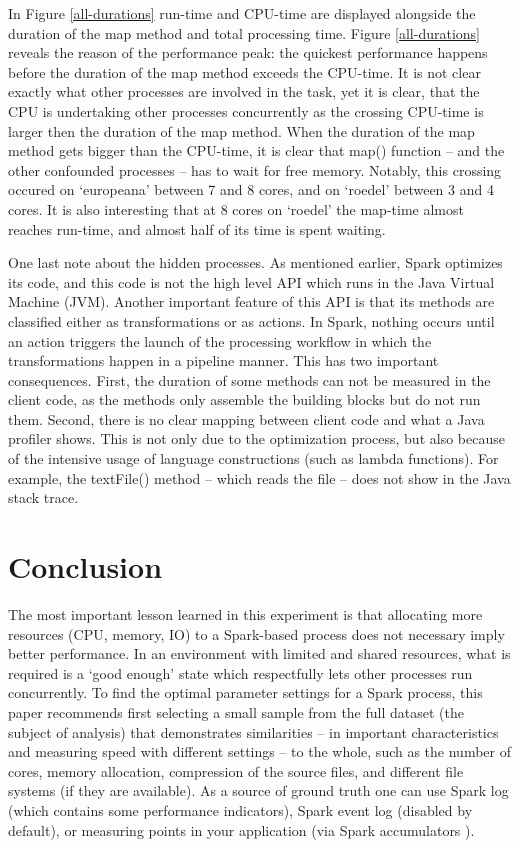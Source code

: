 In Figure \ref{all-durations} run-time and CPU-time are displayed alongside the duration of the map method and total processing time. Figure \ref{all-durations} reveals the reason of the performance peak: the quickest performance happens before the duration of the map method exceeds the CPU-time. It is not clear exactly what other processes are involved in the task, yet it is clear, that the CPU is undertaking other processes concurrently as the crossing CPU-time is larger then the duration of the map method. When the duration of the map method gets bigger than the CPU-time, it is clear that map() function -- and the other confounded processes -- has to wait for free memory. Notably, this crossing occured on `europeana' between 7 and 8 cores, and on `roedel' between 3 and 4 cores. It is also interesting that at 8 cores on `roedel' the map-time almost reaches run-time, and almost half of its time is spent waiting.

One last note about the hidden processes. As mentioned earlier, Spark optimizes its code, and this code is not the high level API which runs in the Java Virtual Machine (JVM). Another important feature of this API is that its methods are classified either as transformations or as actions. In Spark, nothing occurs until an action triggers the launch of the processing workflow in which the transformations happen in a pipeline manner. This has two important consequences. First, the duration of some methods can not be measured in the client code, as the methods only assemble the building blocks but do not run them. Second, there is no clear mapping between client code and what a Java profiler shows. This is not only due to the optimization process, but also because of the intensive usage of language constructions (such as lambda functions). For example, the textFile() method -- which reads the file -- does not show in the Java stack trace.

\section{Conclusion}

The most important lesson learned in this experiment is that allocating more resources  (CPU, memory, IO) to a Spark-based process does not necessary imply better performance. In an environment with limited and shared resources, what is required is a ‘good enough’ state which respectfully lets other processes run concurrently. To find the optimal parameter settings for a Spark process, this paper recommends first selecting a small sample from the full dataset (the subject of analysis) that demonstrates similarities -- in important characteristics and measuring speed with different settings -- to the whole, such as the number of cores, memory allocation, compression of the source files, and different file systems (if they are available). As a source of ground truth one can use Spark log (which contains some performance indicators), Spark event log (disabled by default), or measuring points in your application (via Spark accumulators \cite{spark-accumulators}).

% 
% 
